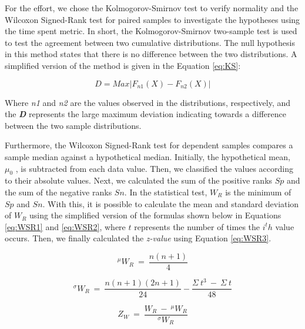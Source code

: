 For the effort, we chose the Kolmogorov-Smirnov test to verify normality and the Wilcoxon Signed-Rank test for paired samples to investigate the hypotheses using the time spent metric.
In short, the Kolmogorov-Smirnov two-sample test is used to test the agreement between two cumulative distributions.
The null hypothesis in this method states that there is no difference between the two distributions.
A simplified version of the method is given in the Equation \ref{eq:KS}:

\begin{equation}
\label{eq:KS}
    D = Max|F_{n1}(X) - F_{n2}(X)|
\end{equation}

Where \textit{n1} and \textit{n2} are the values observed in the distributions, respectively, and the \textbf{\textit{D}} represents the large maximum deviation indicating towards a difference between the two sample distributions. 

Furthermore, the Wilcoxon Signed-Rank test for dependent samples compares a sample median against a hypothetical median.
Initially, the hypothetical mean, $\mu_0$ , is subtracted from each data value. 
Then, we classified the values according to their absolute values.
Next, we calculated the sum of the positive ranks $Sp$ and the sum of the negative ranks $Sn$. 
In the statistical test, $W_R$ is the minimum of $Sp$ and $Sn$. 
With this, it is possible to calculate the mean and standard deviation of $W_R$ using the simplified version of the formulas shown below in Equations \ref{eq:WSR1} and \ref{eq:WSR2}, where $t$ represents the number of times the $i^th$ value occurs.
Then, we finally calculated the \textit{z-value} using Equation \ref{eq:WSR3}.

\begin{equation}
\label{eq:WSR1}
   ^\mu W_R~=~\frac{n(n+1)}{4}
\end{equation}

\begin{equation}
\label{eq:WSR2}
    ^\sigma W_R~=~\frac{n(n+1)(2n+1)}{24}-\frac{\Sigma~t^3~-~\Sigma~t}{48}
\end{equation}

\begin{equation}
\label{eq:WSR3}
    Z_W~=~\frac{W_R~-~^\mu W_R}{^\sigma W_R}
\end{equation}

